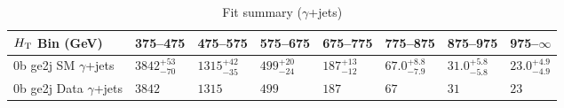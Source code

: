 \documentclass[8pt]{article}
\def\scalht{\mbox{$H_{\rm{T}}$}\xspace}
\newcommand\T{\rule{0pt}{2.6ex}}
\begin{document}
\begin{table}[ht!]
\caption{Fit summary ($\gamma$+jets)}
\label{tab:ensemble-summary}
\centering
\begin{tabular}{ llllllll }

\hline
\scalht Bin (GeV)       & 375--475                       & 475--575                       & 575--675                       & 675--775                       & 775--875                       & 875--975                       & 975--$\infty$                  \\ [1.000000ex]
\hline
0b ge2j SM $\gamma$+jets\T & $3842^{+53}_{-70}$             & $1315^{+42}_{-35}$             & $499^{+20}_{-24}$              & $187^{+13}_{-12}$              & $67.0^{+8.8}_{-7.9}$           & $31.0^{+5.8}_{-5.8}$           & $23.0^{+4.9}_{-4.9}$           \\ 
0b ge2j Data $\gamma$+jets\T & $3842$                         & $1315$                         & $499$                          & $187$                          & $67$                           & $31$                           & $23$                           \\ 
\hline

\end{tabular}
\end{table}
\end{document}
